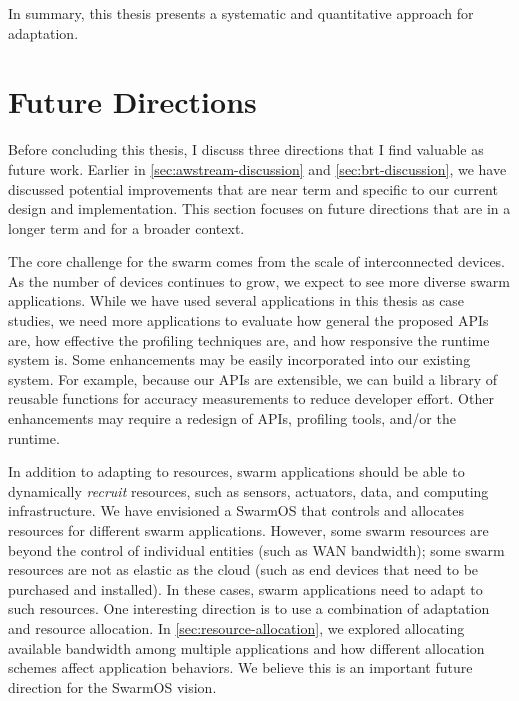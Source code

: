 \documentclass[thesis.tex]{subfiles}
\begin{document}
In summary, this thesis presents a systematic and quantitative approach for
adaptation.

\section{Future Directions}
\label{sec:future-directions}

Before concluding this thesis, I discuss three directions that I find valuable
as future work. Earlier in \autoref{sec:awstream-discussion} and
\autoref{sec:brt-discussion}, we have discussed potential improvements that are
near term and specific to our current design and implementation. This section
focuses on future directions that are in a longer term and for a broader
context.

 The core challenge for the
swarm comes from the scale of interconnected devices. As the number of devices
continues to grow, we expect to see more diverse swarm applications. While we
have used several applications in this thesis as case studies, we need more
applications to evaluate how general the proposed APIs are, how effective the
profiling techniques are, and how responsive the runtime system is. Some
enhancements may be easily incorporated into our existing system. For example,
because our APIs are extensible, we can build a library of reusable functions
for accuracy measurements to reduce developer effort. Other enhancements may
require a redesign of APIs, profiling tools, and/or the runtime.

 In addition to adapting to resources,
swarm applications should be able to dynamically \emph{recruit} resources, such
as sensors, actuators, data, and computing infrastructure. We have envisioned a
SwarmOS that controls and allocates resources for different swarm
applications. However, some swarm resources are beyond the control of individual
entities (such as WAN bandwidth); some swarm resources are not as elastic as the
cloud (such as end devices that need to be purchased and installed). In these
cases, swarm applications need to adapt to such resources. One interesting
direction is to use a combination of adaptation and resource allocation. In
\autoref{sec:resource-allocation}, we explored allocating available bandwidth
among multiple applications and how different allocation schemes affect
application behaviors. We believe this is an important future direction for the
SwarmOS vision.
\end{document}
